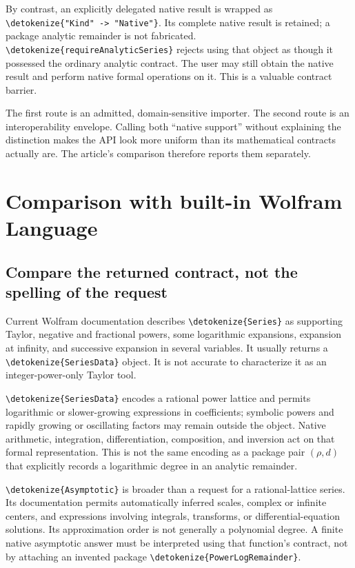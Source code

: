 \documentclass[11pt,a4paper]{article}
\newcommand{\wl}[1]{\texttt{\expandafter\nolinkurl\expandafter{\detokenize{#1}}}}
\begin{document}
By contrast, an explicitly delegated native result is wrapped as
\wl{"Kind" -> "Native"}. Its complete native result is retained; a package
analytic remainder is not fabricated. \wl{requireAnalyticSeries} rejects using
that object as though it possessed the ordinary analytic contract. The user may
still obtain the native result and perform native formal operations on it.
This is a valuable contract barrier.\cite{native,nativedoc}

The first route is an admitted, domain-sensitive importer. The second route is
an interoperability envelope. Calling both ``native support'' without explaining
the distinction makes the API look more uniform than its mathematical contracts
actually are. The article's comparison therefore reports them separately.

\section{Comparison with built-in Wolfram Language}

\subsection{Compare the returned contract, not the spelling of the request}

Current Wolfram documentation describes \wl{Series} as supporting Taylor,
negative and fractional powers, some logarithmic expansions, expansion at
infinity, and successive expansion in several variables. It usually returns a
\wl{SeriesData} object. It is not accurate to characterize it as an
integer-power-only Taylor tool.\cite{wlseries}

\wl{SeriesData} encodes a rational power lattice and permits logarithmic or
slower-growing expressions in coefficients; symbolic powers and rapidly growing
or oscillating factors may remain outside the object. Native arithmetic,
integration, differentiation, composition, and inversion act on that formal
representation. This is not the same encoding as a package pair $(\rho,d)$
that explicitly records a logarithmic degree in an analytic remainder.\cite{wlseriesdata}

\wl{Asymptotic} is broader than a request for a rational-lattice series. Its
documentation permits automatically inferred scales, complex or infinite
centers, and expressions involving integrals, transforms, or differential-equation
solutions. Its approximation order is not generally a polynomial degree.
A finite native asymptotic answer must be interpreted using that function's
contract, not by attaching an invented package \wl{PowerLogRemainder}.
\cite{wlasymptotic}
\end{document}
